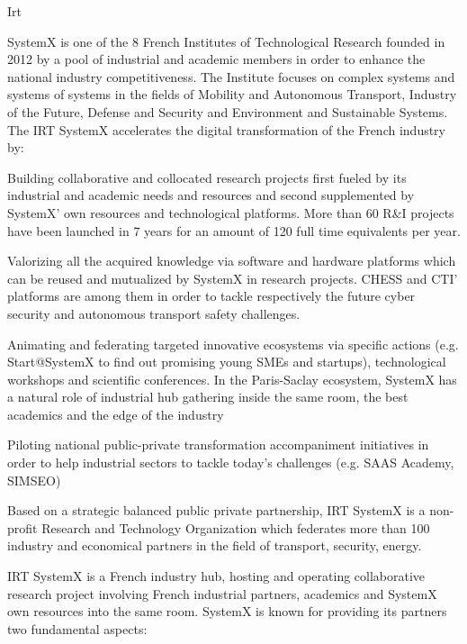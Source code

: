 \begin{sitedescription}{Irt}


SystemX is one of the 8 French Institutes of Technological Research founded in 2012 by a pool of industrial and academic members in order to enhance the national industry competitiveness. The Institute focuses on complex systems and systems of systems in the fields of Mobility and Autonomous Transport, Industry of the Future, Defense and Security and Environment and Sustainable Systems. The IRT SystemX accelerates the digital transformation of the French industry by:

\begin{compactitem}
\item Building collaborative and collocated research projects first fueled by its industrial and academic needs and resources and second supplemented by SystemX’ own resources and technological platforms. More than 60 R\&I projects have been launched in 7 years for an amount of 120 full time equivalents per year.
\item Valorizing all the acquired knowledge via software and hardware platforms which can be reused and mutualized by SystemX in research projects. CHESS and CTI’ platforms are among them in order to tackle respectively the future cyber security and autonomous transport safety challenges.
\item Animating and federating targeted innovative ecosystems via specific actions (e.g. Start@SystemX to find out promising young SMEs and startups), technological workshops and scientific conferences. In the Paris-Saclay ecosystem, SystemX has a natural role of industrial hub gathering inside the same room, the best academics and the edge of the industry
\item Piloting national public-private transformation accompaniment initiatives in order to help industrial sectors to tackle today’s challenges (e.g. SAAS Academy, SIMSEO)
\end{compactitem}

Based on a strategic balanced public private partnership, IRT SystemX is a non-profit Research and Technology Organization which federates more than 100 industry and economical partners in the field of transport, security, energy.

IRT SystemX is a French industry hub, hosting and operating collaborative research project involving French industrial partners, academics and SystemX own resources into the same room. SystemX is known for providing its partners two fundamental aspects:


\end{sitedescription}
